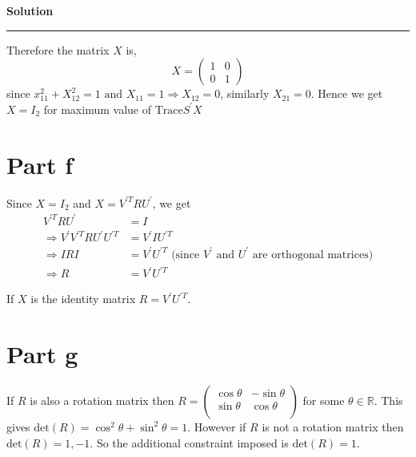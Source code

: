 \documentclass[a4paper,14pt]{article}
\newenvironment{solution}[2][]{%
    \begin{mdframed}[linecolor=blue!70!black, linewidth=2pt, roundcorner=10pt, backgroundcolor=yellow!10!white, skipabove=12pt, skipbelow=12pt]%
        \textbf{\large #2}
        \par\noindent\rule{\textwidth}{0.4pt}
}{
    \end{mdframed}
}
\begin{document}
\begin{solution}{Solution}
    Therefore the matrix $X$ is,
    \[ X = \begin{pmatrix}
      1 & 0 \\
      0 & 1
    \end{pmatrix}\]
    since $x_{11}^{2} + X_{12}^{2} = 1 \text{ and } X_{11} = 1 \Rightarrow X_{12} = 0$, similarly $X_{21} = 0$. Hence we get 
    $X = I_{2}$ for maximum value of $\text{Trace}S^{'}X$

    \section{Part f}
      Since $X = I_{2}$ and $X = V^{'T}RU^{'}$, we get 
      \begin{align*}
        V^{'T}RU^{'} &= I \\
        \Rightarrow V^{'}V^{'T}RU^{'}U^{'T} &= V^{'}IU^{'T} \\
        \Rightarrow I R I &= V^{'}U^{'T} \text{ (since $V^{'}$ and $U^{'}$ are orthogonal matrices)}\\
        \Rightarrow R &= V^{'}U^{'T}
      \end{align*}

      If $X$ is the identity matrix $R = V^{'}U^{'T}$.
    \section{Part g}
      If $R$ is also a rotation matrix then $R = \begin{pmatrix}
        \cos \theta & - \sin \theta \\
        \sin \theta & \cos \theta \\
      \end{pmatrix}$
      for some $\theta \in \mathbb{R}$. This gives $\text{det}(R) = \cos^{2} \theta + \sin^{2} \theta = 1$. However if $R$
      is not a rotation matrix then $\text{det}(R) = 1,-1$. So the additional constraint imposed is $\text{det}(R) = 1$.
    

\end{solution}
\end{document}
